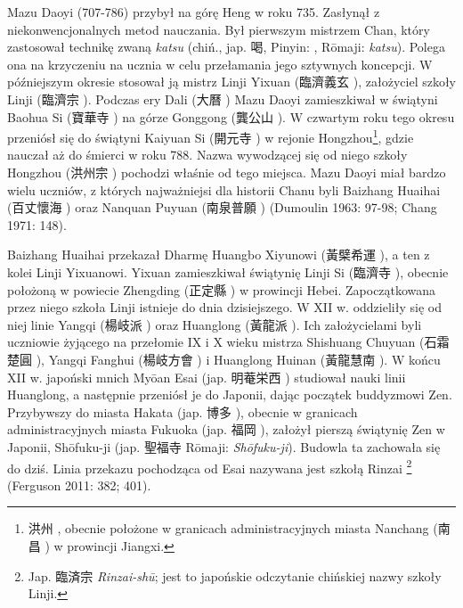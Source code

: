 Mazu Daoyi (707-786) przybył na górę Heng w roku 735.
Zasłynął z niekonwencjonalnych metod nauczania.
Był pierwszym mistrzem Chan, który zastosował technikę zwaną \textit{katsu} (chiń., jap. 喝, Pinyin: , Rōmaji: \textit{katsu}).
Polega ona na krzyczeniu na ucznia w celu przełamania jego sztywnych koncepcji.
W późniejszym okresie stosował ją mistrz Linji Yixuan (臨濟義玄 ), założyciel szkoły Linji (臨濟宗 ). %
Podczas ery Dali (大曆 ) Mazu Daoyi zamieszkiwał w świątyni Baohua Si (寶華寺 ) na górze Gonggong (龔公山 ).
W czwartym roku tego okresu przeniósł się do świątyni Kaiyuan Si (開元寺 ) w rejonie Hongzhou\footnote{洪州 , obecnie położone w granicach administracyjnych miasta Nanchang (南昌 ) w prowincji Jiangxi.}, gdzie nauczał aż do śmierci w roku 788.
Nazwa wywodzącej się od niego szkoły Hongzhou (洪州宗 ) pochodzi właśnie od tego miejsca.
Mazu Daoyi miał bardzo wielu uczniów, z których najważniejsi dla historii Chanu byli Baizhang Huaihai (百丈懷海 ) oraz Nanquan Puyuan (南泉普願 )
(Dumoulin 1963: 97-98; Chang 1971: 148).

Baizhang Huaihai przekazał Dharmę Huangbo Xiyunowi (黃檗希運 ), a ten z kolei Linji Yixuanowi.
Yixuan zamieszkiwał świątynię Linji Si (臨濟寺 ), obecnie położoną w powiecie Zhengding (正定縣 ) w prowincji Hebei.
Zapoczątkowana przez niego szkoła Linji istnieje do dnia dzisiejszego.
W XII w. oddzieliły się od niej linie Yangqi (楊岐派 ) oraz Huanglong (黃龍派 ).
Ich założycielami byli uczniowie żyjącego na przełomie IX i X wieku mistrza Shishuang Chuyuan (石霜楚圓 ), Yangqi Fanghui (楊岐方會 ) i Huanglong Huinan (黃龍慧南 ).
W końcu XII w. japoński mnich Myōan Esai (jap. 明菴栄西 ) studiował nauki linii Huanglong, a następnie przeniósł je do Japonii, dając początek buddyzmowi Zen.
Przybywszy do miasta Hakata (jap. {\ipaexgothic 博多} ), obecnie w granicach administracyjnych miasta Fukuoka (jap. {\ipaexgothic 福岡} ), założył pierszą świątynię Zen w Japonii, Shōfuku-ji (jap. {\ipaexgothic 聖福寺} Rōmaji: \textit{Shōfuku-ji}).
Budowla ta zachowała się do dziś.
Linia przekazu pochodząca od Esai nazywana jest szkołą Rinzai%
\footnote{Jap. {\ipaexgothic 臨済宗} \textit{Rinzai-shū}; jest to japońskie odczytanie chińskiej nazwy szkoły Linji.}
(Ferguson 2011: 382; 401).

